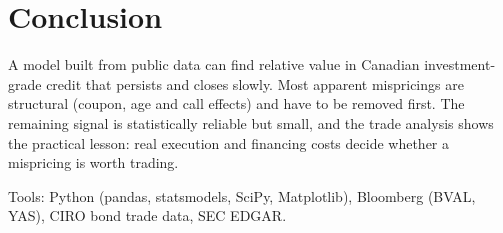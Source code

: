 \documentclass[11pt,letterpaper]{article}
\begin{document}
\section{Conclusion}
A model built from public data can find relative value in Canadian investment-grade credit that persists and closes slowly. Most apparent mispricings are structural (coupon, age and call effects) and have to be removed first. The remaining signal is statistically reliable but small, and the trade analysis shows the practical lesson: real execution and financing costs decide whether a mispricing is worth trading.

\vspace{4pt}
{\small\color{gray} Tools: Python (pandas, statsmodels, SciPy, Matplotlib), Bloomberg (BVAL, YAS), CIRO bond trade data, SEC EDGAR.}
\end{document}
